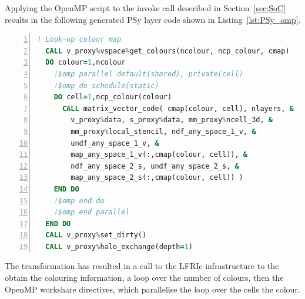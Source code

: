 \documentclass[review,times]{elsarticle}
\begin{document}
%
%
%
%

Applying the OpenMP script to the invoke call described in
Section~\ref{sec:SoC} results in the following generated PSy layer
code shown in Listing~\ref{lst:PSy_omp}. 
\begin{lstlisting}[language=Fortran, numbers=left,caption={Code 
fragment of the generated PSy layer},label={lst:PSy_omp}]
  ! Look-up colour map
  CALL v_proxy%vspace%get_colours(ncolour, ncp_colour, cmap)
  DO colour=1,ncolour
    !$omp parallel default(shared), private(cell)
    !$omp do schedule(static)
    DO cell=1,ncp_colour(colour)
      CALL matrix_vector_code( cmap(colour, cell), nlayers, &
        v_proxy%data, s_proxy%data, mm_proxy%ncell_3d, & 
        mm_proxy%local_stencil, ndf_any_space_1_v, &
        undf_any_space_1_v, &
        map_any_space_1_v(:,cmap(colour, cell)), &
        ndf_any_space_2_s, undf_any_space_2_s, &
        map_any_space_2_s(:,cmap(colour, cell)) )
    END DO 
    !$omp end do
    !$omp end parallel
  END DO 
  CALL v_proxy%set_dirty()
  CALL v_proxy%halo_exchange(depth=1)
\end{lstlisting}
The transformation has resulted in a call to the LFRIc infrastructure
to the obtain the colouring information, a loop over the number of
colours, then the OpenMP workshare directives, which parallelise the
loop over the cells the colour.
\end{document}
